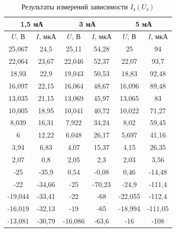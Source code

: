 \documentclass[a4paper]{article}
\theoremstyle{definition}
\theoremstyle{remark}
\begin{document}
    \begin{table}[h!]
        \centering
        \caption{Результаты измерений зависимости $I_{\text{з}}(U_{\text{з}})$}
        \begin{tabular}{|c|c|c|c|c|c|}
        \hline
        \multicolumn{2}{|c|}{1,5 мА} & \multicolumn{2}{c|}{3 мА} & \multicolumn{2}{c|}{5 мА} \\ \hline
        $U$, В       & $I$, мкА      & $U$, В      & $I$, мкА    & $U$, В      & $I$, мкА    \\ \hline
        25,067       & 24,5          & 25,11       & 54,28       & 25          & 94          \\ \hline
        22,064       & 23,67         & 22,046      & 52,37       & 22,07       & 93,7        \\ \hline
        18,93        & 22,9          & 19,043      & 50,53       & 18,83       & 92,48       \\ \hline
        16,097       & 22,15         & 16,064      & 48,67       & 16,096      & 89,48       \\ \hline
        13,035       & 21,15         & 13,069      & 45,97       & 13,065      & 83          \\ \hline
        10,005       & 18,95         & 10,041      & 40,72       & 10,022      & 71,27       \\ \hline
        8,039        & 16,31         & 7,922       & 34,24       & 8,02        & 59,45       \\ \hline
        6            & 12,22         & 6,048       & 26,17       & 5,697       & 41,16       \\ \hline
        3,94         & 6,83          & 4,07        & 15,37       & 4,15        & 26,35       \\ \hline
        2,07         & 0,8           & 2,05        & 2,3         & 2,03        & 3,56        \\ \hline
        -25          & -35,9         & 0,54        & -0,08       & 0,46        & -14,48      \\ \hline
        -22          & -34,66        & -25         & -70,23      & -24,9       & -111,4      \\ \hline
        -19,044      & -33,41        & -22         & -68         & -22,055     & -112,4      \\ \hline
        -16,019      & -32,13        & -19         & -65         & -18,994     & -111,05     \\ \hline
        -13,081      & -30,79        & -16,086     & -63,6       & -16         & -108        \\ \hline

\end{tabular}
\end{table}
\end{document}
